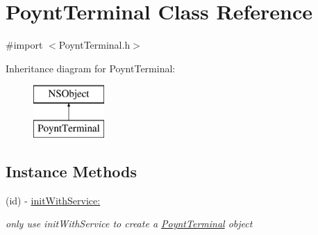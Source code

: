 \hypertarget{interface_poynt_terminal}{}\section{Poynt\+Terminal Class Reference}
\label{interface_poynt_terminal}


{\ttfamily \#import $<$Poynt\+Terminal.\+h$>$}

Inheritance diagram for Poynt\+Terminal\+:\begin{figure}[H]
\begin{center}
\leavevmode
\includegraphics[height=2.000000cm]{interface_poynt_terminal}
\end{center}
\end{figure}
\subsection*{Instance Methods}
\begin{DoxyCompactItemize}
\item 
(id) -\/ \hyperlink{interface_poynt_terminal_a85d039f4fe918b4ab91b90c1bac883f1}{init\+With\+Service\+:}
\begin{DoxyCompactList}\small\item\em only use init\+With\+Service to create a \hyperlink{interface_poynt_terminal}{Poynt\+Terminal} object \end{DoxyCompactList}\end{DoxyCompactItemize}
